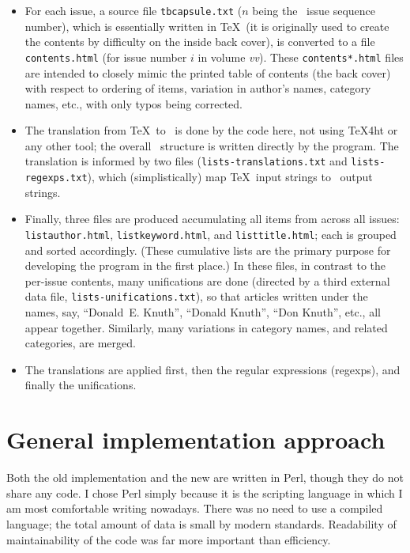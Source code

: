 \documentclass[final]{ltugboat}
\def\code#1{{\tt #1}}
\begin{document}
\begin{itemize}
\item For each issue, a source file \code{tbcapsule.txt} ($n$
being the \TUB\ issue sequence number), which is essentially written in
\TeX\ (it is originally used to create the contents by difficulty on the
inside back cover), is converted to a file
\code{contents.html} (for issue number $i$ in volume
\textit{vv}). These \code{contents*.html} files are intended to closely
mimic the printed table of contents (the back cover) with respect to
ordering of items, variation in author's names, category names, etc.,
with only typos being corrected.

\item The translation from \TeX\ to \HTML\ is done by the code
here, not using \TeX4ht or any other tool; the overall \HTML\
structure is written directly by the program. The translation is
informed by two files (\code{lists-translations.txt} and
\code{lists-regexps.txt}), which (simplistically) map \TeX\ input
strings to \HTML\ output strings.

\item Finally, three files are produced accumulating all items from
across all issues: \code{listauthor.html}, \code{listkeyword.html}, and
\code{listtitle.html}; each is grouped and sorted accordingly. (These
cumulative lists are the primary purpose for developing the program in
the first place.) In these files, in contrast to the per-issue contents,
many unifications are done (directed by a third external data file,
\code{lists-unifications.txt}), so that articles written under the
names, say, ``Donald~E. Knuth'', ``Donald Knuth'', ``Don Knuth'', etc.,
all appear together. Similarly, many variations in category names, and
related categories, are merged.

\item The translations are applied first, then the regular expressions
(regexps), and finally the unifications.

\end{itemize}

\section{General implementation approach}

Both the old implementation and the new are written in Perl, though they
do not share any code. I chose Perl simply because it is the scripting
language in which I am most comfortable writing nowadays. There was no
need to use a compiled language; the total amount of data is small by
modern standards. Readability of maintainability of the code was far
more important than efficiency.
\end{document}
